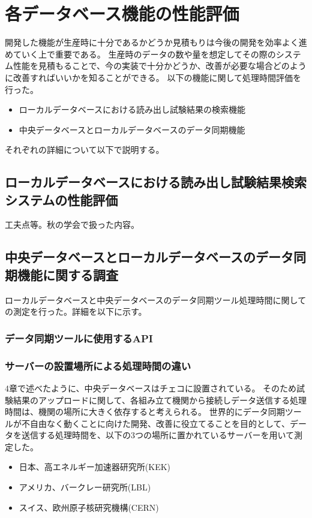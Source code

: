 \chapter{各データベース機能の性能評価}

開発した機能が生産時に十分であるかどうか見積もりは今後の開発を効率よく進めていく上で重要である。
生産時のデータの数や量を想定してその際のシステム性能を見積もることで、今の実装で十分かどうか、改善が必要な場合どのように改善すればいいかを知ることができる。
以下の機能に関して処理時間評価を行った。

\begin{itemize}
  \item ローカルデータベースにおける読み出し試験結果の検索機能
  \item 中央データベースとローカルデータベースのデータ同期機能
\end{itemize}

それぞれの詳細について以下で説明する。

\section{ローカルデータベースにおける読み出し試験結果検索システムの性能評価}
工夫点等。秋の学会で扱った内容。

\section{中央データベースとローカルデータベースのデータ同期機能に関する調査}
ローカルデータベースと中央データベースのデータ同期ツール処理時間に関しての測定を行った。詳細を以下に示す。
\subsection{データ同期ツールに使用するAPI}


\subsection{サーバーの設置場所による処理時間の違い}
4章で述べたように、中央データベースはチェコに設置されている。
そのため試験結果のアップロードに関して、各組み立て機関から接続しデータ送信する処理時間は、機関の場所に大きく依存すると考えられる。
世界的にデータ同期ツールが不自由なく動くことに向けた開発、改善に役立てることを目的として、データを送信する処理時間を、以下の3つの場所に置かれているサーバーを用いて測定した。

\begin{itemize}
  \item 日本、高エネルギー加速器研究所(KEK) 
  \item アメリカ、バークレー研究所(LBL)
  \item スイス、欧州原子核研究機構(CERN)
\end{itemize}

